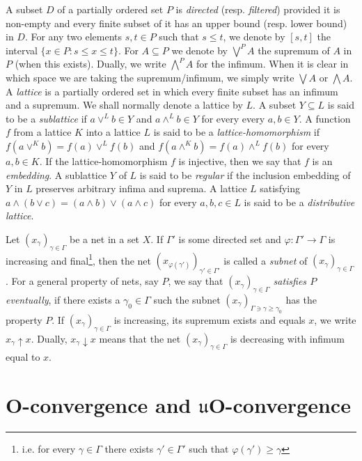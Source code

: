\documentclass[12pt,a4paper]{amsart}
\numberwithin{equation}{section}
\theoremstyle{definition}
\newcommand{\sss}[1]{{\scriptscriptstyle #1}}
\newcommand{\lbigvee}[1]{\bigvee^{\scriptscriptstyle #1}}
\newcommand{\lbigwedge}[1]{\bigwedge^{\scriptscriptstyle #1}}
\begin{document}
A subset $D$ of a partially ordered set $P$ is \textit{directed} (resp. \emph{filtered}) provided it is non-empty and every finite subset of it has an upper bound (resp. lower bound) in $D$. For any two elements $s,t \in P$ such that $s \leq t$, we denote by $[s,t]$ the interval $\{x \in P : s \leq x \leq t\}$. For $A \subseteq P$ we denote by $\lbigvee{P} A$  the supremum of $A$ in ${P}$ (when this exists). Dually, we write $\lbigwedge{P} A$ for the infimum.  When it is clear in which space we are taking the supremum/infimum, we simply write $\bigvee A$ or $\bigwedge A$.  A \emph{lattice} is a partially ordered set in which every finite subset has an infimum and a supremum.  We shall normally denote a lattice by  ${L}$. A subset $Y \subseteq L$ is said to be a \textit{sublattice} if $a \vee^{\scriptscriptstyle L} b \in Y$ and $a \wedge^{\scriptscriptstyle L} b \in Y$ for every every $a,b \in Y$. A function $f$ from a lattice $K$ into a lattice $L$ is said to be a \textit{lattice-homomorphism} if $f(a\vee^{\sss K} b)=f(a)\vee^{\sss L} f(b)$ and $f(a\wedge^{\sss K} b)=f(a)\wedge^{\sss L}f(b)$ for every $a,b\in K$.  If the lattice-homomorphism  $f$ is injective, then we say that $f$ is an \emph{embedding}.  A sublattice $Y$ of $L$ is said to be \textit{regular}  if the inclusion embedding of $Y$ in $L$ preserves arbitrary infima and suprema.   A lattice $L$ satisfying $a \wedge (b \vee c) = (a \wedge b) \vee (a \wedge c)$ for every $a,b,c \in L$ is said to be a \textit{distributive lattice}.

Let $(x_\gamma)_{\gamma\in \Gamma}$ be a net in a set $X$. If $\Gamma'$ is some directed set and $\varphi:\Gamma'\to\Gamma$ is increasing and final\footnote{i.e. for every $\gamma\in \Gamma$ there exists $\gamma'\in\Gamma'$ such that $\varphi(\gamma')\ge \gamma$}, then the net $(x_{\varphi(\gamma')})_{\gamma'\in\Gamma'}$ is called a \emph{subnet} of $(x_\gamma)_{\gamma\in \Gamma}$.
For a general property of nets, say $P$,   we say that  \emph{$(x_\gamma)_{\gamma\in\Gamma}$ satisfies $P$ eventually}, if there exists a $\gamma_0\in \Gamma$ such the subnet
$(x_\gamma)_{\Gamma\ni\gamma\ge\gamma_0}$ has the property $P$.  If $(x_\gamma)_{\gamma\in\Gamma}$ is  increasing, its supremum exists and equals $x$, we write $x_\gamma\uparrow x$.  Dually, $x_\gamma\downarrow x$ means that the net $(x_\gamma)_{\gamma\in\Gamma}$ is  decreasing with infimum equal to $x$.



\section{O-convergence and $\mathfrak{u}$O-convergence}
\end{document}
